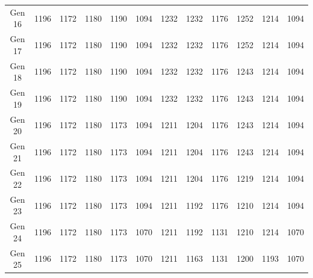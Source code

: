 \documentclass[12pt]{article}
\begin{document}
\begin{table}[h]
\begin{adjustbox}{max width=1\textwidth}
\begin{tabular}{*{12}{c}}
            Gen 16 & 1196 & 1172 & 1180 & 1190 & 1094 & 1232 & 1232 & 1176 & 1252 & 1214 & 1094 \\
            Gen 17 & 1196 & 1172 & 1180 & 1190 & 1094 & 1232 & 1232 & 1176 & 1252 & 1214 & 1094 \\
            Gen 18 & 1196 & 1172 & 1180 & 1190 & 1094 & 1232 & 1232 & 1176 & 1243 & 1214 & 1094 \\
            Gen 19 & 1196 & 1172 & 1180 & 1190 & 1094 & 1232 & 1232 & 1176 & 1243 & 1214 & 1094 \\
            Gen 20 & 1196 & 1172 & 1180 & 1173 & 1094 & 1211 & 1204 & 1176 & 1243 & 1214 & 1094 \\
            Gen 21 & 1196 & 1172 & 1180 & 1173 & 1094 & 1211 & 1204 & 1176 & 1243 & 1214 & 1094 \\
            Gen 22 & 1196 & 1172 & 1180 & 1173 & 1094 & 1211 & 1204 & 1176 & 1219 & 1214 & 1094 \\
            Gen 23 & 1196 & 1172 & 1180 & 1173 & 1094 & 1211 & 1192 & 1176 & 1210 & 1214 & 1094 \\
            Gen 24 & 1196 & 1172 & 1180 & 1173 & 1070 & 1211 & 1192 & 1131 & 1210 & 1214 & 1070 \\
            Gen 25 & 1196 & 1172 & 1180 & 1173 & 1070 & 1211 & 1163 & 1131 & 1200 & 1193 & 1070 \\
            \bottomrule
        \end{tabular}
    \end{adjustbox}
\end{table}

\end{document}
